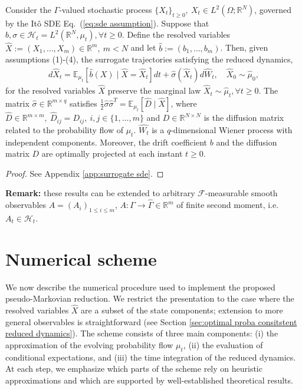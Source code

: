 \documentclass[11pt, a4paper, oneside, reqno]{amsart}
\begin{document}
\begin{proposition}\label{prop:stochastic}
Consider the $\Gamma$-valued stochastic process $\{X_t\}_{t\geq 0}, \ X_t\in L^2(\Omega;\mathbb{R}^N)$, governed by the Itô SDE Eq.~(\ref{eq:sde assumption}). 
Suppose that $b,\sigma \in\mathcal{H}_t=L^2(\mathbb{R}^N,\mu_t),\forall t \geq 0$. Define the resolved variables $\hat{X}:=(X_1,\dots,X_m)\in\mathbb{R}^m, \ m<N$ and let $\hat{b}:=(b_1,\dots,b_m)$.
Then, given assumptions (1)-(4), the surrogate trajectories satisfying the reduced dynamics,
\begin{eqnarray}\label{eq:optimal prob consistent sde}
    d\hat{X}_t = \mathbb{E}_{\mu_t}[\hat{b}(X)\mid\hat{X}=\hat{X}_t]dt + \hat{\sigma}(\hat{X}_t)d\hat{W}_t, \quad
    \hat{X}_0 \sim \hat{\mu}_0,
\end{eqnarray}
for the resolved variables $\hat{X}$ preserve the marginal law $\hat{X}_t\sim\hat{\mu}_t, \forall t\geq 0$.
The matrix $\hat{\sigma}\in\mathbb{R}^{m \times q}$ satisfies $\frac{1}{2}\hat{\sigma}\hat{\sigma}^T = \mathbb{E}_{\mu_t}[\hat{D}\mid\hat{X}]$, where $\hat{D}\in\mathbb{R}^{m\times m}, \: \hat{D}_{ij}=D_{ij}, \: i,j\in\{1,\dots,m\}$ and $D\in\mathbb{R}^{N\times N}$ is the diffusion matrix related to the probability flow of $\mu_t$.
$\hat{W_t}$ is a $q$-dimensional Wiener process with independent components.
Moreover, the drift coefficient $b$ and the diffusion matrix $D$ are optimally projected at each instant $t\geq 0$.
\end{proposition}

\begin{proof}
See Appendix \ref{app:surrogate sde}.
\end{proof}

\noindent \textbf{Remark:} these results can be extended to arbitrary $\mathcal{F}$-measurable smooth observables $A=(A_i)_{1\leq i\leq m}$, $A:\Gamma\to\hat{\Gamma}\in\mathbb{R}^m$ of finite second moment, i.e. $A_t\in\mathcal{H}_t$.
\section{Numerical scheme}
\label{sec:numerics}
\noindent We now describe the numerical procedure used to implement the proposed pseudo-Markovian reduction. We restrict the presentation to the case where the resolved variables  $\hat{X}$ are a subset of the state components; extension to more general observables is straightforward (see Section \ref{sec:optimal proba consitstent reduced dynamics}). The scheme consists of three main components: (i) the approximation of the evolving probability flow $\mu_t$, 
(ii) the evaluation of conditional expectations, and (iii) the time integration of the reduced dynamics. 
At each step, we emphasize which parts of the scheme rely on heuristic approximations and which are supported by well-established theoretical results. 
\end{document}
